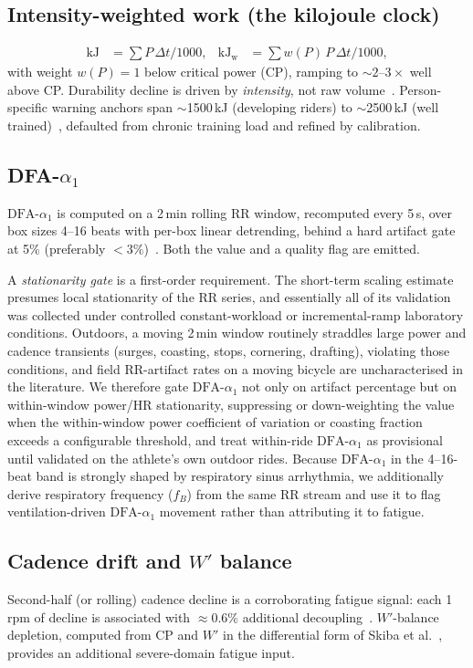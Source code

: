 \documentclass[11pt]{article}
\newcommand{\aone}{\ensuremath{\text{DFA-}\alpha_1}}
\begin{document}
\subsection{Intensity-weighted work (the kilojoule clock)}\label{sec:kjclock}
\begin{align}
\text{kJ} &= \sum P\,\Delta t / 1000, &
\text{kJ}_{\text{w}} &= \sum w(P)\,P\,\Delta t / 1000,
\label{eq:kj}
\end{align}
with weight $w(P)=1$ below critical power (CP), ramping to ${\sim}2$--$3\times$ well above CP. Durability decline is driven by \emph{intensity}, not raw volume~\cite{spragg}. Person-specific warning anchors span $\sim$1500\,kJ (developing riders) to $\sim$2500\,kJ (well trained)~\cite{durabreview}, defaulted from chronic training load and refined by calibration.

\subsection{DFA-$\alpha_1$}\label{sec:dfa}
$\aone$ is computed on a 2\,min rolling RR window, recomputed every 5\,s, over box sizes 4--16 beats with per-box linear detrending, behind a hard artifact gate at 5\% (preferably ${<}3\%$)~\cite{rogers2020,rogers2022}. Both the value and a quality flag are emitted.

A \emph{stationarity gate} is a first-order requirement. The short-term scaling estimate presumes local stationarity of the RR series, and essentially all of its validation was collected under controlled constant-workload or incremental-ramp laboratory conditions. Outdoors, a moving 2\,min window routinely straddles large power and cadence transients (surges, coasting, stops, cornering, drafting), violating those conditions, and field RR-artifact rates on a moving bicycle are uncharacterised in the literature. We therefore gate $\aone$ not only on artifact percentage but on within-window power/HR stationarity, suppressing or down-weighting the value when the within-window power coefficient of variation or coasting fraction exceeds a configurable threshold, and treat within-ride $\aone$ as provisional until validated on the athlete's own outdoor rides. Because $\aone$ in the 4--16-beat band is strongly shaped by respiratory sinus arrhythmia, we additionally derive respiratory frequency ($f_B$) from the same RR stream and use it to flag ventilation-driven $\aone$ movement rather than attributing it to fatigue.

\subsection{Cadence drift and $W'$ balance}\label{sec:cadence}
Second-half (or rolling) cadence decline is a corroborating fatigue signal: each 1\,rpm of decline is associated with $\approx 0.6\%$ additional decoupling~\cite{barsumyan}. $W'$-balance depletion, computed from CP and $W'$ in the differential form of Skiba et al.~\cite{skiba}, provides an additional severe-domain fatigue input.
\end{document}
